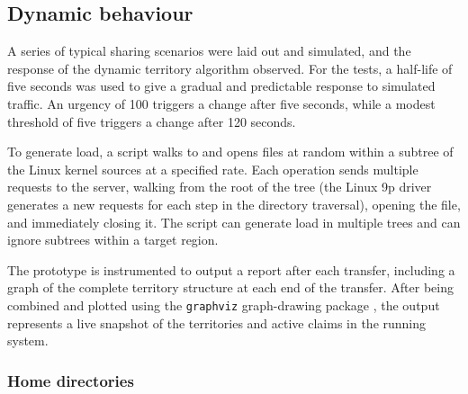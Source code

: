 \subsection{Dynamic behaviour}

A series of typical sharing scenarios were laid out and simulated, and the response of the dynamic territory algorithm observed. For the tests, a half-life of five seconds was used to give a gradual and predictable response to simulated traffic. An urgency of 100 triggers a change after five seconds, while a modest threshold of five triggers a change after 120 seconds.

To generate load, a script walks to and opens files at random within a subtree of the Linux kernel sources at a specified rate. Each operation sends multiple requests to the server, walking from the root of the tree (the Linux 9p driver generates a new requests for each step in the directory traversal), opening the file, and immediately closing it. The script can generate load in multiple trees and can ignore subtrees within a target region.

The prototype is instrumented to output a report after each transfer, including a graph of the complete territory structure at each end of the transfer. After being combined and plotted using the \texttt{graphviz} graph-drawing package \cite{gansner}, the output represents a live snapshot of the territories and active claims in the running system.

\subsubsection{Home directories}

